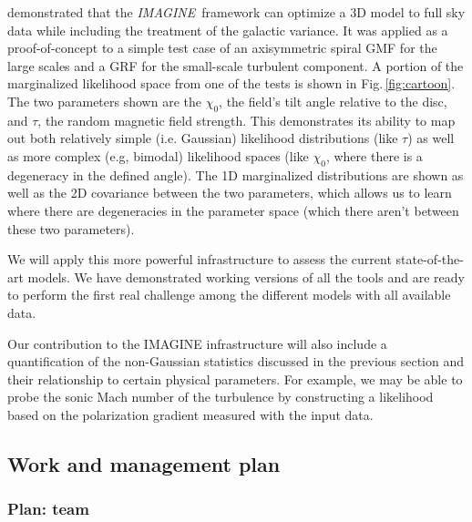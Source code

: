 \documentclass[12pt]{article}
\newcommand{\imagineSW}{\textsl{IMAGINE}}
\begin{document}
\citet{steininger:2018} demonstrated that the \imagineSW\ framework can optimize a 3D model to full sky data while including the treatment of the galactic variance.  It was applied as a proof-of-concept to a simple test case of an axisymmetric spiral GMF for the large scales and a GRF for the small-scale turbulent component. A portion of the marginalized likelihood space from one of the tests is shown in Fig.\,\ref{fig:cartoon}.  The two parameters shown are the $\chi_0$, the field's tilt angle relative to the disc, and $\tau$, the random magnetic field strength.  This demonstrates its ability to map out both relatively simple (i.e. Gaussian) likelihood distributions (like $\tau$) as well as more complex (e.g, bimodal) likelihood spaces (like $\chi_0$, where there is a degeneracy in the defined angle). The 1D marginalized distributions are shown as well as the 2D covariance between the two parameters, which allows us to learn where there are degeneracies in the parameter space (which there aren't between these two parameters).

We will apply this more powerful infrastructure to assess the current state-of-the-art models. We have demonstrated working versions of all the tools and are ready to perform the first real challenge among the different models with all available data.

Our contribution to the IMAGINE infrastructure will also include a quantification of the non-Gaussian statistics discussed in the previous section and their relationship to certain physical parameters.  For example, we may be able to probe the sonic Mach number of the turbulence by constructing a likelihood based on the polarization gradient measured with the input data.  


\subsection*{Work and management plan}


\subsubsection*{Plan:  team}
\end{document}
